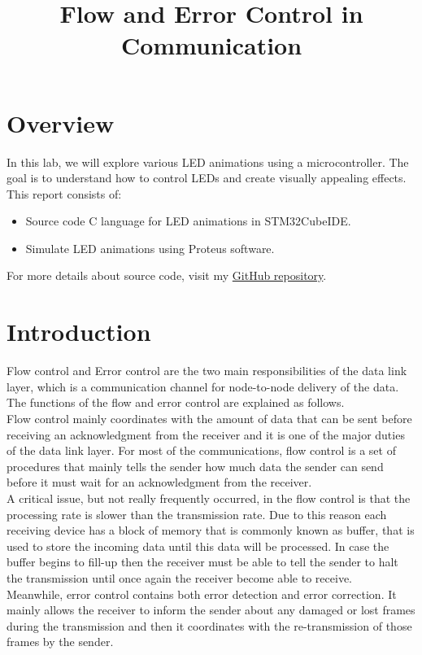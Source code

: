 \documentclass[twoside, final]{hcmut_report}
\title{\Large Flow and Error Control in Communication}
\begin{document}
\coverpage
\pagestyle{empty}
\tableofcontents
\pagestyle{fancy}
\pagebreak
\section{Overview}
In this lab, we will explore various LED animations using a microcontroller. The goal is to understand how to control LEDs and create visually appealing effects.
This report consists of:
\begin{itemize}
    \item Source code C language for LED animations in STM32CubeIDE.
    \item Simulate LED animations using Proteus software.
\end{itemize}
For more details about source code, visit my \href{https://github.com/batmaon512/Microcontroller-251.git}{GitHub repository}.

\section{Introduction}
Flow control and Error control are the two main responsibilities of the data link layer, which is a communication channel for node-to-node delivery of the data. The functions of the flow and error control are explained as follows.\\

Flow control mainly coordinates with the amount of data that can be sent before receiving an acknowledgment from the receiver and it is one of the major duties of the data link layer. For most of the communications, flow control is a set of procedures that mainly tells the sender how much data the sender can send before it must wait for an acknowledgment from the receiver.\\

A critical issue, but not really frequently occurred, in the flow control is that the processing rate is slower than the transmission rate. Due to this reason each receiving device has a block of memory that is commonly known as buffer, that is used to store the incoming data until this data will be processed. In case the buffer begins to fill-up then the receiver must be able to tell the sender to halt the transmission until once again the receiver become able to receive.\\

Meanwhile, error control contains both error detection and error correction. It mainly allows the receiver to inform the sender about any damaged or lost frames during the transmission and then it coordinates with the re-transmission of those frames by the sender.\\
\end{document}
